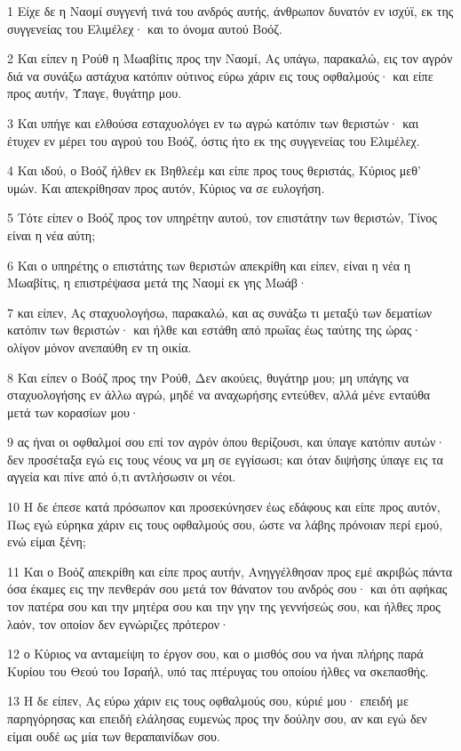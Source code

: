 \par 1 Είχε δε η Ναομί συγγενή τινά του ανδρός αυτής, άνθρωπον δυνατόν εν ισχύϊ, εκ της συγγενείας του Ελιμέλεχ· και το όνομα αυτού Βοόζ.
\par 2 Και είπεν η Ρούθ η Μωαβίτις προς την Ναομί, Ας υπάγω, παρακαλώ, εις τον αγρόν διά να συνάξω αστάχυα κατόπιν ούτινος εύρω χάριν εις τους οφθαλμούς· και είπε προς αυτήν, Ύπαγε, θυγάτηρ μου.
\par 3 Και υπήγε και ελθούσα εσταχυολόγει εν τω αγρώ κατόπιν των θεριστών· και έτυχεν εν μέρει του αγρού του Βοόζ, όστις ήτο εκ της συγγενείας του Ελιμέλεχ.
\par 4 Και ιδού, ο Βοόζ ήλθεν εκ Βηθλεέμ και είπε προς τους θεριστάς, Κύριος μεθ' υμών. Και απεκρίθησαν προς αυτόν, Κύριος να σε ευλογήση.
\par 5 Τότε είπεν ο Βοόζ προς τον υπηρέτην αυτού, τον επιστάτην των θεριστών, Τίνος είναι η νέα αύτη;
\par 6 Και ο υπηρέτης ο επιστάτης των θεριστών απεκρίθη και είπεν, είναι η νέα η Μωαβίτις, η επιστρέψασα μετά της Ναομί εκ γης Μωάβ·
\par 7 και είπεν, Ας σταχυολογήσω, παρακαλώ, και ας συνάξω τι μεταξύ των δεματίων κατόπιν των θεριστών· και ήλθε και εστάθη από πρωΐας έως ταύτης της ώρας· ολίγον μόνον ανεπαύθη εν τη οικία.
\par 8 Και είπεν ο Βοόζ προς την Ρούθ, Δεν ακούεις, θυγάτηρ μου; μη υπάγης να σταχυολογήσης εν άλλω αγρώ, μηδέ να αναχωρήσης εντεύθεν, αλλά μένε ενταύθα μετά των κορασίων μου·
\par 9 ας ήναι οι οφθαλμοί σου επί τον αγρόν όπου θερίζουσι, και ύπαγε κατόπιν αυτών· δεν προσέταξα εγώ εις τους νέους να μη σε εγγίσωσι; και όταν διψήσης ύπαγε εις τα αγγεία και πίνε από ό,τι αντλήσωσιν οι νέοι.
\par 10 Η δε έπεσε κατά πρόσωπον και προσεκύνησεν έως εδάφους και είπε προς αυτόν, Πως εγώ εύρηκα χάριν εις τους οφθαλμούς σου, ώστε να λάβης πρόνοιαν περί εμού, ενώ είμαι ξένη;
\par 11 Και ο Βοόζ απεκρίθη και είπε προς αυτήν, Ανηγγέλθησαν προς εμέ ακριβώς πάντα όσα έκαμες εις την πενθεράν σου μετά τον θάνατον του ανδρός σου· και ότι αφήκας τον πατέρα σου και την μητέρα σου και την γην της γεννήσεώς σου, και ήλθες προς λαόν, τον οποίον δεν εγνώριζες πρότερον·
\par 12 ο Κύριος να ανταμείψη το έργον σου, και ο μισθός σου να ήναι πλήρης παρά Κυρίου του Θεού του Ισραήλ, υπό τας πτέρυγας του οποίου ήλθες να σκεπασθής.
\par 13 Η δε είπεν, Ας εύρω χάριν εις τους οφθαλμούς σου, κύριέ μου· επειδή με παρηγόρησας και επειδή ελάλησας ευμενώς προς την δούλην σου, αν και εγώ δεν είμαι ουδέ ως μία των θεραπαινίδων σου.
